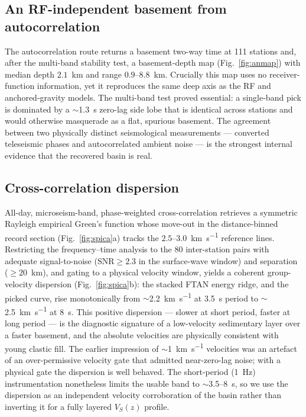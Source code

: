 \subsection{An RF-independent basement from autocorrelation}
The autocorrelation route returns a basement two-way time at 111 stations and,
after the multi-band stability test, a basement-depth map (Fig.~\ref{fig:anmap})
with median depth $2.1$~km and range $0.9$--$8.8$~km. Crucially this map uses no
receiver-function information, yet it reproduces the same deep axis as the RF and
anchored-gravity models. The multi-band test proved essential: a single-band pick
is dominated by a $\sim$1.3~s zero-lag side lobe that is identical across stations
and would otherwise masquerade as a flat, spurious basement. The agreement between
two physically distinct seismological measurements --- converted teleseismic
phases and autocorrelated ambient noise --- is the strongest internal evidence
that the recovered basin is real.

\subsection{Cross-correlation dispersion}
All-day, microseism-band, phase-weighted cross-correlation retrieves a symmetric
Rayleigh empirical Green's function whose move-out in the distance-binned record
section (Fig.~\ref{fig:spica}a) tracks the $2.5$--$3.0$~\si{\km\per\s} reference
lines. Restricting the frequency--time analysis to the 80 inter-station pairs with
adequate signal-to-noise ($\mathrm{SNR}\ge2.3$ in the surface-wave window) and
separation ($\ge20$~km), and gating to a physical velocity window, yields a
coherent group-velocity dispersion (Fig.~\ref{fig:spica}b): the stacked FTAN
energy ridge, and the picked curve, rise monotonically from
$\sim$2.2~\si{\km\per\s} at 3.5~s period to $\sim$2.5~\si{\km\per\s} at 8~s. This
positive dispersion --- slower at short period, faster at long period --- is the
diagnostic signature of a low-velocity sedimentary layer over a faster basement,
and the absolute velocities are physically consistent with young clastic fill. The
earlier impression of $\sim$1~\si{\km\per\s} velocities was an artefact of an
over-permissive velocity gate that admitted near-zero-lag noise; with a physical
gate the dispersion is well behaved. The short-period (1~Hz) instrumentation
nonetheless limits the usable band to $\sim$3.5--8~s, so we use the dispersion as
an independent velocity corroboration of the basin rather than inverting it for a
fully layered $V_S(z)$ profile.

